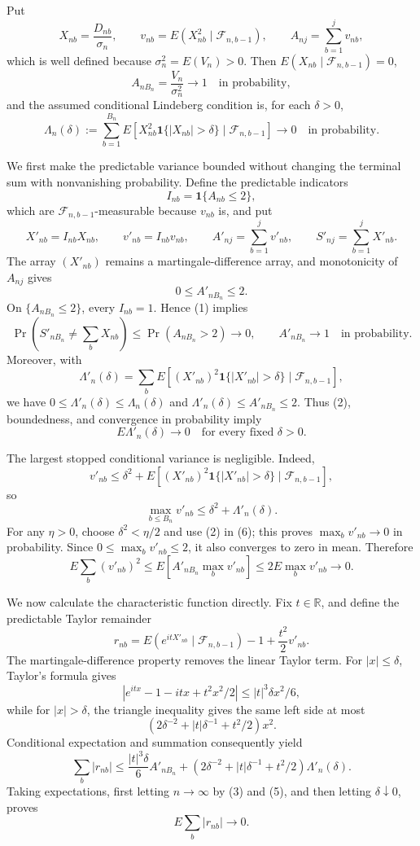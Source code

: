 Put
\[
X_{nb}=\frac{D_{nb}}{\sigma_n},\qquad
v_{nb}=E(X_{nb}^2\mid\mathcal F_{n,b-1}),\qquad
A_{nj}=\sum_{b=1}^{j}v_{nb},
\]
which is well defined because \(\sigma_n^2=E(V_n)>0\). Then \(E(X_{nb}\mid\mathcal F_{n,b-1})=0\),
\[
A_{nB_n}=\frac{V_n}{\sigma_n^2}\longrightarrow1
\quad\text{in probability},
\tag{1}
\]
and the assumed conditional Lindeberg condition is, for each \(\delta>0\),
\[
\Lambda_n(\delta):=\sum_{b=1}^{B_n}
E\!\left[X_{nb}^2\mathbf1\{|X_{nb}|>\delta\}\mid\mathcal F_{n,b-1}\right]
\longrightarrow0
\quad\text{in probability}.
\tag{2}
\]

We first make the predictable variance bounded without changing the terminal sum with nonvanishing probability. Define the predictable indicators
\[
I_{nb}=\mathbf1\{A_{nb}\le2\},
\]
which are \(\mathcal F_{n,b-1}\)-measurable because \(v_{nb}\) is, and put
\[
X'_{nb}=I_{nb}X_{nb},\qquad
v'_{nb}=I_{nb}v_{nb},\qquad
A'_{nj}=\sum_{b=1}^{j}v'_{nb},\qquad
S'_{nj}=\sum_{b=1}^{j}X'_{nb}.
\]
The array \((X'_{nb})\) remains a martingale-difference array, and monotonicity of \(A_{nj}\) gives
\[
0\le A'_{nB_n}\le2.
\tag{3}
\]
On \(\{A_{nB_n}\le2\}\), every \(I_{nb}=1\). Hence (1) implies
\[
\Pr\!\left(S'_{nB_n}\ne\sum_bX_{nb}\right)
\le\Pr(A_{nB_n}>2)\longrightarrow0,
\qquad
A'_{nB_n}\longrightarrow1
\quad\text{in probability}.
\tag{4}
\]
Moreover, with
\[
\Lambda'_n(\delta)=\sum_bE\!\left[(X'_{nb})^2
\mathbf1\{|X'_{nb}|>\delta\}\mid\mathcal F_{n,b-1}\right],
\]
we have \(0\le\Lambda'_n(\delta)\le\Lambda_n(\delta)\) and \(\Lambda'_n(\delta)\le A'_{nB_n}\le2\). Thus (2), boundedness, and convergence in probability imply
\[
E\Lambda'_n(\delta)\longrightarrow0
\quad\text{for every fixed }\delta>0.
\tag{5}
\]

The largest stopped conditional variance is negligible. Indeed,
\[
v'_{nb}
\le \delta^2+E\!\left[(X'_{nb})^2
\mathbf1\{|X'_{nb}|>\delta\}\mid\mathcal F_{n,b-1}\right],
\]
so
\[
\max_{b\le B_n}v'_{nb}\le\delta^2+\Lambda'_n(\delta).
\tag{6}
\]
For any \(\eta>0\), choose \(\delta^2<\eta/2\) and use (2) in (6); this proves \(\max_bv'_{nb}\to0\) in probability. Since \(0\le\max_bv'_{nb}\le2\), it also converges to zero in mean. Therefore
\[
E\sum_b(v'_{nb})^2
\le E\!\left[A'_{nB_n}\max_bv'_{nb}\right]
\le2E\max_bv'_{nb}\longrightarrow0.
\tag{7}
\]

We now calculate the characteristic function directly. Fix \(t\in\mathbb R\), and define the predictable Taylor remainder
\[
r_{nb}=E(e^{itX'_{nb}}\mid\mathcal F_{n,b-1})-1+\frac{t^2}{2}v'_{nb}.
\]
The martingale-difference property removes the linear Taylor term. For \(|x|\le\delta\), Taylor's formula gives
\[
|e^{itx}-1-itx+t^2x^2/2|\le |t|^3\delta x^2/6,
\]
while for \(|x|>\delta\), the triangle inequality gives the same left side at most
\[
\left(2\delta^{-2}+|t|\delta^{-1}+t^2/2\right)x^2.
\]
Conditional expectation and summation consequently yield
\[
\sum_b|r_{nb}|
\le \frac{|t|^3\delta}{6}A'_{nB_n}
+\left(2\delta^{-2}+|t|\delta^{-1}+t^2/2\right)\Lambda'_n(\delta).
\tag{8}
\]
Taking expectations, first letting \(n\to\infty\) by (3) and (5), and then letting \(\delta\downarrow0\), proves
\[
E\sum_b|r_{nb}|\longrightarrow0.
\tag{9}
\]

